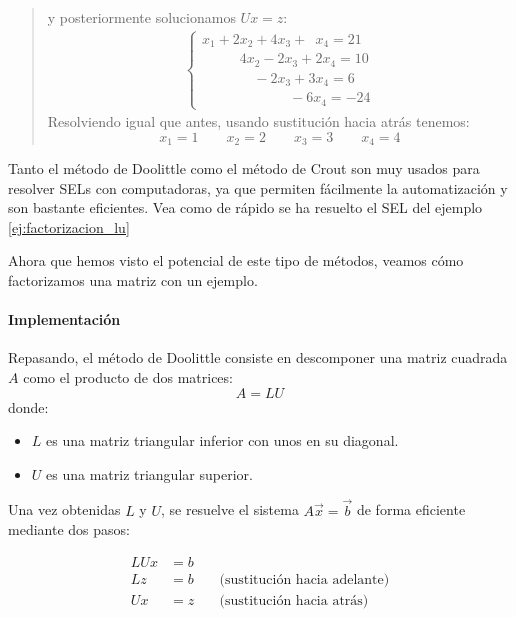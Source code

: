 \begin{quote}
  y posteriormente solucionamos \(Ux=z\):
    \begin{align*}
    \begin{cases}
      x_1 +2x_2 + 4x_3 + \phantom{0}x_4 = 21 \\
      \phantom{0x_1 +} 4 x_2 - 2x_3 + 2x_4 = 10 \\
      \phantom{x_1 + 0x_2} - 2x_3 + 3x_4 = 6 \\
      \phantom{x_1 + x_2 + 0x_30}-6x_4 = -24
    \end{cases}
  \end{align*}
  Resolviendo igual que antes, usando sustitución hacia atrás tenemos:
  \[x_1 = 1 \qquad x_2 = 2 \qquad x_3 = 3 \qquad x_4 = 4\]
\end{quote}

\begin{tcolorbox}[title=Usos de este método]
  Tanto el método de Doolittle como el método de Crout son muy usados para resolver SELs con computadoras, ya que permiten fácilmente la automatización y son bastante eficientes. Vea como de rápido se ha resuelto el SEL del ejemplo \ref{ej:factorizacion_lu}
\end{tcolorbox}

Ahora que hemos visto el potencial de este tipo de métodos, veamos cómo factorizamos una matriz con un ejemplo.

\paragraph{Implementación}

Repasando, el método de Doolittle consiste en descomponer una matriz cuadrada \(A\) como el producto de dos matrices:
\[
A = LU
\]
donde:
\begin{itemize}
  \item \(L\) es una matriz triangular inferior con unos en su diagonal.
  \item \(U\) es una matriz triangular superior.
\end{itemize}

Una vez obtenidas \(L\) y \(U\), se resuelve el sistema \(A\vec{x} = \vec{b}\) de forma eficiente mediante dos pasos:

\begin{align*}
LUx &= b \\
Lz &= b \quad &\text{(sustitución hacia adelante)} \\
Ux &= z \quad &\text{(sustitución hacia atrás)}
\end{align*}


